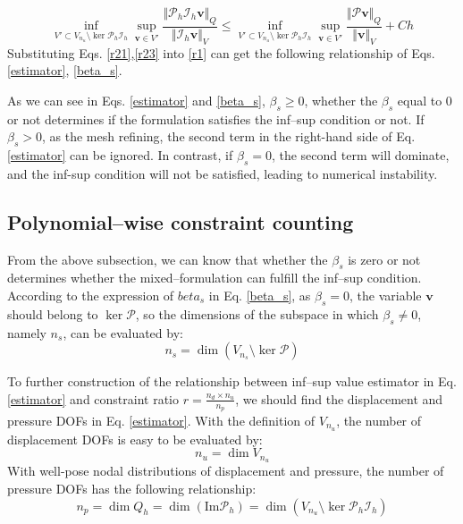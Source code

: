 \begin{pf}
\begin{equation}\label{r23}
    \inf_{V'\subset V_{n_u}\setminus \ker \mathcal P_h \mathcal I_h} \sup_{\boldsymbol v \in V'} \frac{\Vert \mathcal P_h\mathcal I_h\boldsymbol v\Vert_Q}{\Vert \mathcal I_h \boldsymbol v\Vert_V} 
    \le \inf_{V'\subset V_{n_u}\setminus \ker \mathcal P_h \mathcal I_h} \sup_{\boldsymbol v \in V'} \frac{\Vert \mathcal P \boldsymbol v\Vert_Q}{\Vert \boldsymbol v\Vert_V} + Ch 
\end{equation}
Substituting Eqs. \eqref{r21},\eqref{r23} into \eqref{r1} can get the following relationship of Eqs. \eqref{estimator}, \eqref{beta_s}.
\end{pf}

As we can see in Eqs. \eqref{estimator} and \eqref{beta_s},
$\beta_s \ge 0$, whether the $\beta_s$ equal to $0$ or not determines if the formulation satisfies the inf--sup condition or not.
If $\beta_s > 0$, as the mesh refining, the second term in the right-hand side of Eq. \eqref{estimator} can be ignored. In contrast, if $\beta_s = 0$, the second term will dominate, and the inf-sup condition will not be satisfied, leading to numerical instability.

\subsection{Polynomial--wise constraint counting}

From the above subsection, we can know that whether the $\beta_s$ is zero or not determines whether the mixed--formulation can fulfill the inf--sup condition.
According to the expression of $beta_s$ in Eq. \eqref{beta_s},
as $\beta_s = 0$, the variable $\boldsymbol v$ should belong to $\ker \mathcal P$, so the dimensions of the subspace in which $\beta_s \ne 0$, namely $n_s$, can be evaluated by:
\begin{equation}
    n_s = \dim(V_{n_s}\setminus \ker \mathcal P)
\end{equation}

To further construction of the relationship between inf--sup value estimator in Eq. \eqref{estimator} and constraint ratio $r = \frac{n_d\times n_u}{n_p}$,  
we should find the displacement and pressure DOFs in Eq. \eqref{estimator}.
With the definition of $V_{n_u}$, the number of displacement DOFs is easy to be evaluated by:
\begin{equation}
    n_u = \dim V_{n_u}
\end{equation}
With well-pose nodal distributions of displacement and pressure, the number of pressure DOFs has the following relationship:
\begin{equation}
    n_p = \dim Q_h = \dim (\mathrm{Im} \mathcal P_h)
    = \dim (V_{n_u}\setminus \ker \mathcal P_h \mathcal I_h)
\end{equation}

